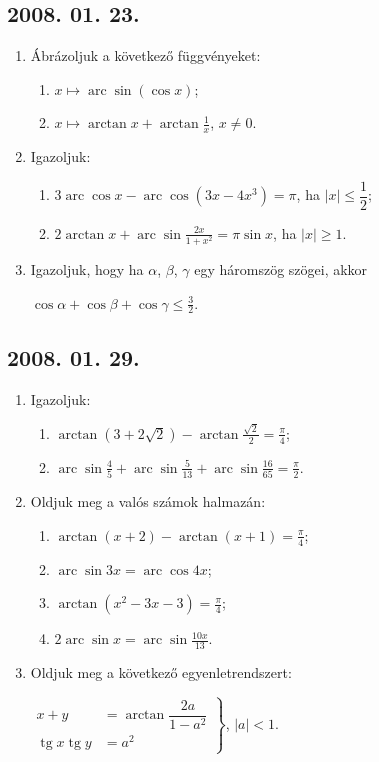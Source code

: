 \documentclass{article}
\newenvironment{abc}{\begin{enumerate}[label=\textit{\alph*})]}{\end{enumerate}}
\newcommand{\tg}{\mathop{\mathrm{tg}}\nolimits}
\newcommand{\arc}{\mathop{\mathrm{arc}}\nolimits}
\renewcommand{\arcsin}{\arc\sin}
\renewcommand{\arccos}{\arc\cos}
\begin{document}
\subsection*{2008. 01. 23.}
\begin{enumerate}
\item Ábrázoljuk a következő függvényeket:
\begin{abc}
\item $x \mapsto \arcsin(\cos x)$;
\item $x \mapsto \arctan x+\arctan \frac{1}{x}$, $x \ne 0$.
\end{abc}
\item Igazoljuk:
\begin{abc}
\item $3 \arccos x-\arccos\left(3x-4x^3\right)=\pi$, ha $|x| \le \dfrac{1}{2}$;
\item $2 \arctan x+\arcsin\displaystyle{\frac{2x}{1+x^2}}=\pi\sin x$, ha $|x| \ge 1$.
\end{abc}
\item Igazoljuk, hogy ha $\alpha$, $\beta$, $\gamma$ egy háromszög szögei, akkor

$\displaystyle{\cos\alpha+\cos\beta+\cos\gamma\le\frac{3}{2}}$.
\end{enumerate}

\subsection*{2008. 01. 29.}
\begin{enumerate}
\item Igazoljuk:
\begin{abc}
\item  $\displaystyle{\arctan\left(3+2\sqrt{2}\right)-\arctan\frac{\sqrt{2}}{2}=\frac{\pi}{4}}$;
\item $\displaystyle{\arcsin\frac{4}{5}+\arcsin\frac{5}{13}+\arcsin\frac{16}{65}=\frac{\pi}{2}}$.
\end{abc}
\item Oldjuk meg a valós számok halmazán:
\begin{abc}
\item $\displaystyle{\arctan(x+2)-\arctan(x+1)=\frac{\pi}{4}}$;
\item $\displaystyle{\arcsin 3x=\arccos 4x}$;
\item $\displaystyle{\arctan(x^2-3x-3)=\frac{\pi}{4}}$;
\item $\displaystyle{2\arcsin x=\arcsin \frac{10x}{13}}$.
\end{abc}
\item Oldjuk meg a következő egyenletrendszert:

$\left.
\begin{aligned}
x+y&=\arctan\dfrac{2a}{1-a^2}\\
\tg x \tg y&=a^2
\end{aligned}
\right\}$, $\displaystyle{|a|<1}$.
\end{enumerate}
\end{document}
